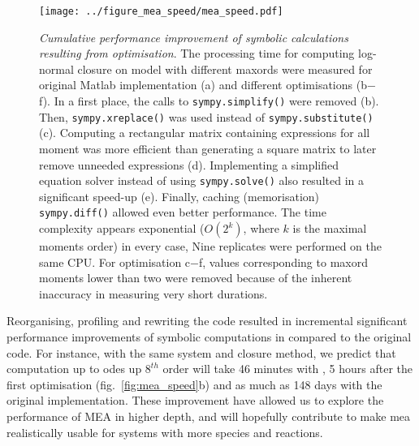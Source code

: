 \begin{figure}[tbh]

\texttt{[image: ../figure\_mea\_speed/mea\_speed.pdf]}
\caption{\emph{Cumulative performance improvement of symbolic 
calculations resulting from optimisation}.
The processing time for computing log-normal closure on \pft{} model with different \gls{maxord}s were measured for original Matlab implementation (a) and different optimisations (b$-$f).
In a first place, the calls to \texttt{sympy.simplify()} were removed (b). 
Then, \texttt{sympy.xreplace()} was used instead of \texttt{sympy.substitute()} (c). 
Computing a rectangular matrix containing expressions for all moment was more efficient than generating a square matrix to later remove unneeded expressions (d).
Implementing a simplified equation solver instead of using \texttt{sympy.solve()} also resulted in a significant speed-up (e). 
Finally, caching (memorisation) \texttt{sympy.diff()} allowed even better performance.
The time complexity appears exponential ($O(2^k)$, where $k$ is the maximal moments order) in every case, 
Nine replicates were performed on the same CPU. 
For optimisation c$-$f, values corresponding to \gls{maxord} moments lower than two were removed because of
the inherent inaccuracy in measuring very short durations.}
\label{fig:mea_speed}
\end{figure}


Reorganising, profiling and rewriting the code resulted in incremental significant performance improvements of symbolic computations in \means{} compared to the original \mat{} code.
For instance, with the same \pft{} system and closure method, 
we predict that computation up to \gls{ode}s up $8^{th}$ order will take 46 minutes with \means{}, 5 hours after the first optimisation (fig.~\autoref{fig:mea_speed}b) and as much as 148 days with the original implementation.
These improvement have allowed us to explore the performance of MEA in higher depth, and will hopefully contribute to make \gls{mea} realistically usable for systems with more species and reactions.


